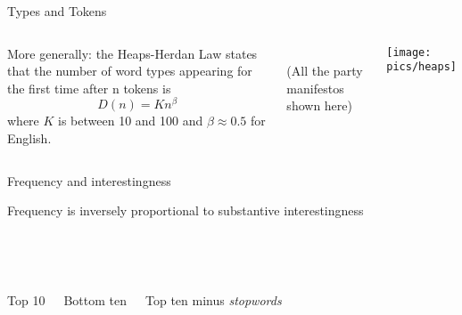\documentclass{hertieteaching}
\begin{document}
\begin{frame}{Types and Tokens}

\begin{columns}[T,onlytextwidth]

More generally: the Heaps-Herdan Law states that the number of
word types appearing for the first time after n tokens is
$$
D(n) = K n^\beta
$$
where $K$ is between 10 and 100 and $\beta \approx 0.5$ for English.

~\\

(All the party manifestos shown here)


\centerline{\texttt{[image: pics/heaps]}}

\end{columns}

\end{frame}

\begin{frame}{Frequency and interestingness}

Frequency is inversely proportional to substantive interestingness

~\\
\begin{columns}[T,onlytextwidth]

\begin{center}


~\\
Top 10
\end{center}


\begin{center}



~\\
Bottom ten
\end{center}

\begin{center}


~\\
Top ten minus \textit{stopwords}
\end{center}

\end{columns}

\end{frame}
\end{document}
